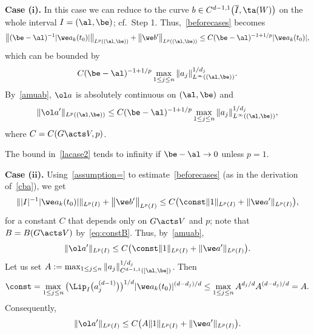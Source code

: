 \medskip\noindent
{\bf Case ($\boldsymbol i$).}
In this case we can reduce to the curve $b \in C^{d-1,1}\big(\overline I,\ta(W)\big)$ on the whole interval $I=(\al,\be)$; cf.\
Step 1. Thus,~\eqref{beforecases} becomes
\begin{gather*}
 \big\|(\be-\al)^{-1} |\we a_k (t_0)| \big\|_{L^p ((\al,\be))}
 + \big\|\we b'\big\|_{L^p((\al,\be))}
 \le C (\be-\al)^{-1+1/p} |\we a_k(t_0)|,
\end{gather*}
which can be bounded by
\begin{gather*} %
 C (\be-\al)^{-1+1/p} \max_{1 \le j \le n} \| a_j\|^{1/d_j}_{L^\infty((\al,\be))}.
\end{gather*}
By~\eqref{amuab}, $\ol a$ is absolutely continuous on $(\al,\be)$ and
\begin{gather} \label{lacase2}
 \|\ol a'\|_{L^p((\al,\be))} \le C (\be-\al)^{-1+1/p} \max_{1 \le j \le n} \|a_j\|^{1/d_j}_{L^\infty((\al,\be))},
\end{gather}
where $C = C(G \acts V,p)$.

\begin{Remark} %
The bound in~\eqref{lacase2} tends to infinity if $\be - \al \to 0$ unless $p=1$.
\end{Remark}


\medskip\noindent
{\bf Case ($\boldsymbol{ii}$).}
Using~\eqref{assumption=} to estimate~\eqref{beforecases} (as in the derivation of~\eqref{cba}),
we get
\begin{gather*}
 \||I|^{-1} |\we a_k (t_0)| \|_{L^p (I)} + \big\|\we b'\big\|_{L^p(I)}
 \le C \big(\const\|1\|_{L^p(I)} + \|\we a'\|_{L^p (I)}\big), %
\end{gather*}
for a constant $C$ that depends only on $G \acts V$ and $p$; note that $B=B(G \acts V)$ by~\eqref{eq:constB}.
Thus, by~\eqref{amuab},
\begin{gather*}
 \|\ol a'\|_{L^p(I)} \le C \big(\const \|1\|_{L^p(I)} + \|\we a'\|_{L^p (I)}\big).
\end{gather*}
Let us set $A : = \max_{1 \le j \le n} \| a_j\|^{1/d_j}_{C^{d-1,1}([\al,\be])}$. Then
\begin{gather*}
 \const = \max_{1 \le j\le n} \big(\Lip_I\big(a_j^{(d-1)}\big)\big)^{1/d} |\we a_k (t_0)|^{(d-d_j)/d}
 \le \max_{1 \le j\le n} A^{d_j/d} A^{(d-d_j)/d} = A.
\end{gather*}
Consequently,
\begin{gather} \label{eq:laIA}
 \|\ol a'\|_{L^p(I)} \le C \big(A \|1\|_{L^p(I)} + \|\we a'\|_{L^p (I)}\big).
\end{gather}

